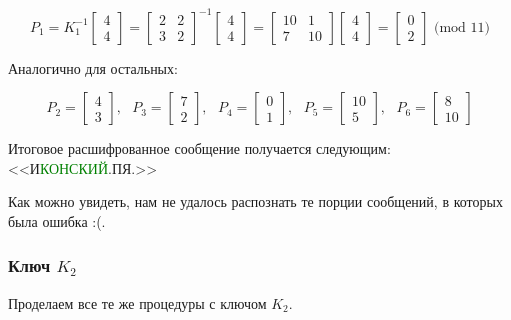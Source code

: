 \documentclass[a4paper,hidelinks,14pt]{extarticle}
\begin{document}
	$$
	P_1 = K_1^{-1}\begin{bmatrix}
		4 \\
		4
	\end{bmatrix} =
	\begin{bmatrix}
		2 & 2 \\
		3 & 2
	\end{bmatrix}^{-1}
	\begin{bmatrix}
		4 \\
		4
	\end{bmatrix}
	=
	\begin{bmatrix}
		10 & 1 \\
		7 & 10
	\end{bmatrix}
	\begin{bmatrix}
		4 \\
		4
	\end{bmatrix}
	=
	\begin{bmatrix}
		0 \\
		2
	\end{bmatrix} \text{ (mod 11)}
	$$
	
	Аналогично для остальных:
	
	$$
	P_2 = \begin{bmatrix}
		4 \\
		3
	\end{bmatrix}, \text{ }
	P_3 = \begin{bmatrix}
		7 \\
		2
	\end{bmatrix}, \text{ }
	P_4 = \begin{bmatrix}
		0 \\
		1
	\end{bmatrix}, \text{ }
	P_5 = \begin{bmatrix}
		10 \\
		5
	\end{bmatrix}, \text{ }
	P_6 = \begin{bmatrix}
		8 \\
		10
	\end{bmatrix}
	$$
	
	Итоговое расшифрованное сообщение получается следующим:\linebreak <<И\textcolor{green}{КОНСКИЙ}.ПЯ.>>
	
	Как можно увидеть, нам не удалось распознать те порции сообщений, в которых была ошибка :(.
	
	\subsubsection{Ключ $K_2$}
	Проделаем все те же процедуры с ключом $K_2$.
	
\end{document}
